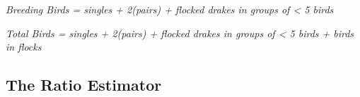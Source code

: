 \documentclass[
]{article}
\begin{document}
\begin{center}

\textit{Breeding Birds = singles + 2(pairs) + flocked drakes in groups of < 5 birds} \newline

\textit{Total Birds = singles + 2(pairs) + flocked drakes in groups of < 5 birds + birds in flocks} \newline

\end{center}

\subsection*{The Ratio Estimator}\label{the-ratio-estimator}
\end{document}
